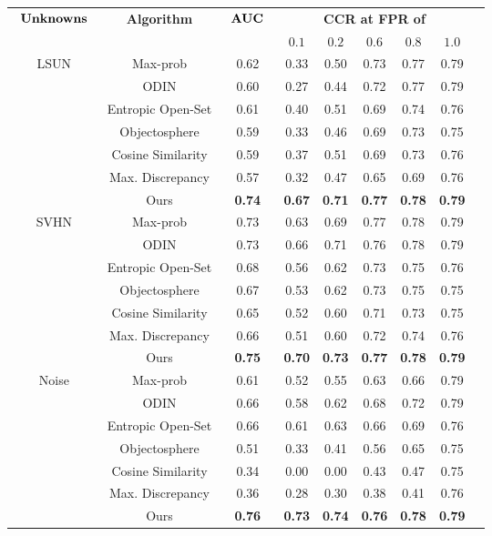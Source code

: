 \begin{tabular}{ccccccccc}
\toprule
\multirow{2}{*}{$\begin{array}{c}\hbox{\bf Unknowns} \\\end{array}$}&
\multirow{2}{*}{\bf Algorithm} & 
\multirow{2}{*}{ $\begin{array}{c}\hbox{\bf AUC}\end{array}$} &
\multicolumn{5}{c}{\bf CCR at FPR of} \\
& & & {$0.1$} & {$0.2$} &  {$0.6$} & {$0.8$} & {$1.0$}
\\ 
\hline
\multirow{6}{*}{LSUN} &         
    Max-prob           &  0.62 &  0.33 &  0.50 &  0.73 &  0.77 &  0.79 \\
&   ODIN               &  0.60 &  0.27 &  0.44 &  0.72 &  0.77 &  0.79 \\
&   Entropic Open-Set  &  0.61 &  0.40 &  0.51 &  0.69 &  0.74 &  0.76 \\
&   Objectosphere      &  0.59 &  0.33 &  0.46 &  0.69 &  0.73 &  0.75 \\
&   Cosine Similarity  &  0.59 &  0.37 &  0.51 &  0.69 &  0.73 &  0.76 \\
&   Max. Discrepancy        &  0.57 &  0.32 &  0.47 &  0.65 &  0.69 &  0.76 \\
&   Ours               &  \textbf{0.74} &  \textbf{0.67} &  \textbf{0.71} &  \textbf{0.77} &  \textbf{0.78} &  \textbf{0.79} \\
\cline{1-8}
\multirow{6}{*}{SVHN} &         
    Max-prob           &  0.73 &  0.63 &  0.69 &  0.77 &  0.78 &  0.79 \\
&   ODIN               &  0.73 &  0.66 &  0.71 &  0.76 &  0.78 &  0.79 \\
&   Entropic Open-Set  &  0.68 &  0.56 &  0.62 &  0.73 &  0.75 &  0.76 \\
&   Objectosphere      &  0.67 &  0.53 &  0.62 &  0.73 &  0.75 &  0.75 \\
&   Cosine Similarity  &  0.65 &  0.52 &  0.60 &  0.71 &  0.73 &  0.75 \\
&   Max. Discrepancy        &  0.66 &  0.51 &  0.60 &  0.72 &  0.74 &  0.76 \\
&   Ours               &  \textbf{0.75} &  \textbf{0.70} &  \textbf{0.73} &  \textbf{0.77} &  \textbf{0.78} &  \textbf{0.79} \\
\cline{1-8}
\multirow{6}{*}{Noise}& 
    Max-prob           &  0.61 &  0.52 &  0.55 &  0.63 &  0.66 &  0.79 \\
&   ODIN               &  0.66 &  0.58 &  0.62 &  0.68 &  0.72 &  0.79 \\
&   Entropic Open-Set  &  0.66 &  0.61 &  0.63 &  0.66 &  0.69 &  0.76 \\
&   Objectosphere      &  0.51 &  0.33 &  0.41 &  0.56 &  0.65 &  0.75 \\
&   Cosine Similarity  &  0.34 &  0.00 &  0.00 &  0.43 &  0.47 &  0.75 \\
&   Max. Discrepancy        &  0.36 &  0.28 &  0.30 &  0.38 &  0.41 &  0.76 \\
&   Ours               &  \textbf{0.76} &  \textbf{0.73} &  \textbf{0.74} &  \textbf{0.76} &  \textbf{0.78} &  \textbf{0.79} \\
\bottomrule
\end{tabular}